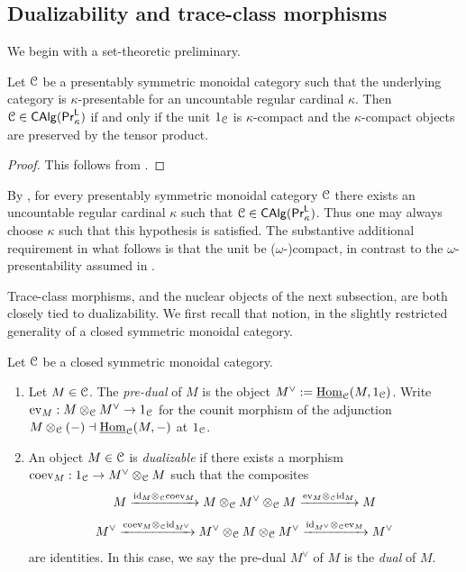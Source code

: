 \subsection{Dualizability and trace-class morphisms}\label{subsec: dualizability and trace-class morphisms}
We begin with a set-theoretic preliminary. 
\begin{lemma}\label{lem: kappa-presentably symmetric monoidal}
    Let $\EuScript{C}$ be a presentably symmetric monoidal category such that the underlying category is $\kappa$-presentable for an uncountable regular cardinal $\kappa$. Then $\EuScript{C}\in\mathsf{CAlg}(\mathsf{Pr}^{\mathsf{L}}_{\kappa})$ if and only if the unit $1_{\EuScript{C}}$ is $\kappa$-compact and the $\kappa$-compact objects are preserved by the tensor product. 
\end{lemma}
\begin{proof}
    This follows from \cite[Not. 5.3.2.8 \& Lem. 5.3.2.11]{HA}.
\end{proof}
\begin{remark}\label{rmk: large kappa}
    By \cite[Lem. 5.3.2.12]{HA}, for every presentably symmetric monoidal category $\EuScript{C}$ there exists an uncountable regular cardinal $\kappa$ such that $\EuScript{C}\in\mathsf{CAlg}(\mathsf{Pr}^{\mathsf{L}}_{\kappa})$. Thus one may always choose $\kappa$ such that this hypothesis is satisfied. The substantive additional requirement in what follows is that the unit be ($\omega$-)compact, in contrast to the $\omega$-presentability assumed in \cite[Lecture VIII]{Complex}.
\end{remark}
Trace-class morphisms, and the nuclear objects of the next subsection, are both closely tied to dualizability. We first recall that notion, in the slightly restricted generality of a closed symmetric monoidal category.
\begin{definition}\label{def: dualizability in closed symmetric monoidal categories}
    Let $\EuScript{C}$ be a closed symmetric monoidal category. 
    \begin{enumerate}
        \item Let $M\in\EuScript{C}$. The \emph{pre-dual} of $M$ is the object $M^{\vee}:=\underline{\mathrm{Hom}}_{\EuScript{C}}(M,1_{\EuScript{C}})$. Write $\mathrm{ev}_{M}:M\otimes_{\EuScript{C}}M^{\vee}\to 1_{\EuScript{C}}$ for the counit morphism of the adjunction $M\otimes_{\EuScript{C}}(-)\dashv\underline{\mathrm{Hom}}_{\EuScript{C}}(M,-)$ at $1_{\EuScript{C}}$. 
        \item An object $M\in\EuScript{C}$ is \emph{dualizable} if there exists a morphism $\mathrm{coev}_{M}:1_{\EuScript{C}}\to M^{\vee}\otimes_{\EuScript{C}}M$ such that the composites 
        $$M\xrightarrow{\mathrm{id}_{M}\otimes_{\EuScript{C}}\mathrm{coev}_{M}}M\otimes_{\EuScript{C}}M^{\vee}\otimes_{\EuScript{C}}M\xrightarrow{\mathrm{ev}_{M}\otimes_{\EuScript{C}}\mathrm{id}_{M}}M$$
        $$M^{\vee}\xrightarrow{\mathrm{coev}_{M}\otimes_{\EuScript{C}}\mathrm{id}_{M^{\vee}}}M^{\vee}\otimes_{\EuScript{C}}M\otimes_{\EuScript{C}}M^{\vee}\xrightarrow{\mathrm{id}_{M^{\vee}}\otimes_{\EuScript{C}}\mathrm{ev}_{M}}M^{\vee}$$
        are identities. In this case, we say the pre-dual $M^{\vee}$ of $M$ is the \emph{dual} of $M$.  
    \end{enumerate}
\end{definition}
